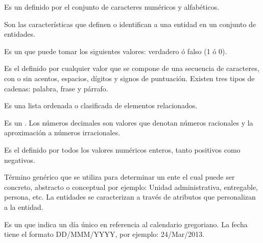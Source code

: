   \begin{description}
  
     Es un  definido por el conjunto de caracteres numéricos y alfabéticos.
        
     Son las características que definen o identifican a una entidad en un conjunto de entidades.

     Es un  que puede tomar los siguientes valores: verdadero ó falso (1 ó 0).
    
     Es el  definido por cualquier valor que se compone de una secuencia de caracteres, con o sin acentos, espacios, dígitos y signos de puntuación. Existen tres tipos de cadenas: palabra, frase y párrafo.
    
     Es una lista ordenada o clasificada de elementos relacionados.
    
     Es un  . Los números decimales son valores que denotan números racionales y la aproximación a números irracionales.
    
     Es el   definido por todos los valores numéricos enteros, tanto positivos como negativos.

     Término genérico que se utiliza para determinar un ente el cual puede ser concreto, abstracto o conceptual por ejemplo: Unidad administrativa, entregable, persona, etc. La entidades se caracterizan a través de atributos que personalizan a la entidad.		

     Es un  que indica un día único en referencia al calendario gregoriano. La fecha tiene el formato DD/MMM/YYYY, por ejemplo: 24/Mar/2013.
    

\end{description}
